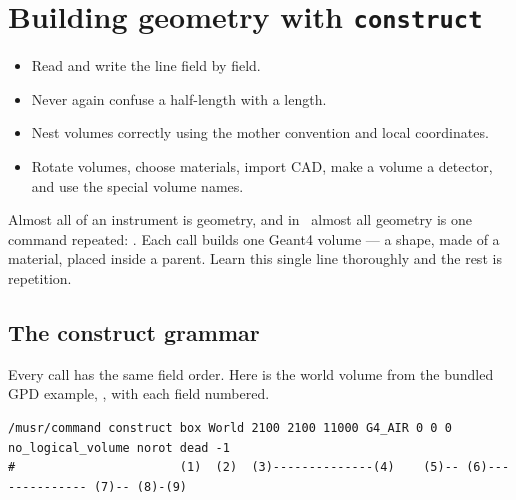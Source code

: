 \chapter{Building geometry with \texttt{construct}}
\label{ch:geometry}

\begin{willdo}
\begin{itemize}
  \item Read and write the  line field by field.
  \item Never again confuse a half-length with a length.
  \item Nest volumes correctly using the  mother convention and local coordinates.
  \item Rotate volumes, choose materials, import CAD, make a volume a detector, and use the special volume names.
\end{itemize}
\end{willdo}

Almost all of an instrument is geometry, and in \musrSim\ almost all geometry is one command repeated: . Each call builds one Geant4 volume --- a shape, made of a material, placed inside a parent. Learn this single line thoroughly and the rest is repetition.

\section{The construct grammar}
Every  call has the same field order. Here is the world volume from the bundled GPD example, , with each field numbered.

\begin{lstlisting}[style=mac,caption={One \texttt{construct} line, dissected}]
/musr/command construct box World 2100 2100 11000 G4_AIR 0 0 0 no_logical_volume norot dead -1
#                       (1)  (2)  (3)--------------(4)    (5)-- (6)-------------- (7)-- (8)-(9)
\end{lstlisting}

